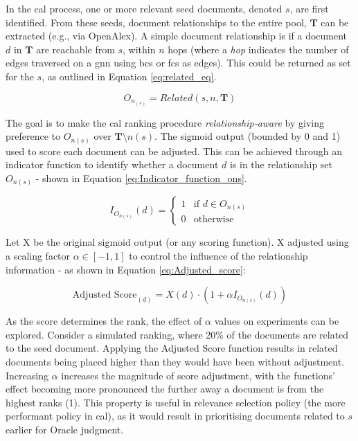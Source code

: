 \documentclass[10pt,oneside]{book}
\begin{document}
In the \gls*{cal} process, one or more relevant seed documents, denoted $s$, are first identified. From these seeds, document relationships to the entire pool, $\textbf{T}$ can be extracted (e.g., via OpenAlex). A simple document relationship is if a document $d$ in $\textbf{T}$ are reachable from $s$, within $n$ hops (where a \emph{hop} indicates the number of edges traversed on a \gls*{gnn} using \gls*{bcs} or \gls*{fcs} as edges). This could be returned as set for the $s$, as outlined in Equation \ref{eq:related_eq}.

\begin{equation}
    O_{n_{(s)}} = Related(s, n,\textbf{T})
   \label{eq:related_eq} 
\end{equation}

The goal is to make the \gls*{cal} ranking procedure \emph{relationship‐aware} by giving preference to $O_{n(s)}$ over $\textbf{T} \setminus {n(s)} $. The sigmoid output (bounded by 0 and 1) used to score each document can be adjusted. This can be achieved through an indicator function to identify whether a document $d$ is in the relationship set $O_{n(s)}$ - shown in Equation \ref{eq:Indicator_function_ons}.

\begin{equation}
    {I_{O_{n(s)}}(d) = \begin{cases}
1 & \text{if } d \in O_{n(s)} \\
0 & \text{otherwise }
\end{cases}}
\label{eq:Indicator_function_ons}
\end{equation}

Let X be the original sigmoid output (or any scoring function). X adjusted using a scaling factor $\alpha \in [-1, 1]$ to control the influence of the relationship information - as shown in Equation \ref{eq:Adjusted_score}:

\begin{equation}
\text{Adjusted Score}_{(d)} = X(d) \cdot(1+\alpha I_{O_{n{(s)}}}(d))
\label{eq:Adjusted_score}
\end{equation}

As the score determines the rank, the effect of $\alpha$ values on experiments can be explored. Consider a simulated ranking, where 20\% of the documents are related to the seed document. Applying the Adjusted Score function results in related documents being placed higher than they would have been without adjustment. Increasing $\alpha$ increases the magnitude of score adjustment, with the functions' effect becoming more pronounced the further away a document is from the highest ranks (1). This property is useful in relevance selection policy (the more performant policy in \gls*{cal}), as it would result in prioritising documents related to $s$ earlier for Oracle judgment.
\end{document}
